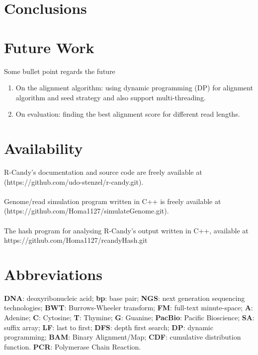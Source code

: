 \documentclass[11pt,a4paper]{report}
\begin{document}
\section{Conclusions}

\section{Future Work}
Some bullet point regards the future
\begin{enumerate}

\item On the alignment algorithm:
using dynamic programming (DP) for alignment algorithm 
and  seed strategy and also support multi-threading.

\item On evaluation: finding the best alignment score for different read lengths.
\end{enumerate}



\section{Availability}

R-Candy's documentation and source code are freely available at\\
 (https://github.com/udo-stenzel/r-candy.git).
\\\\
Genome/read simulation program written in C++ is freely available at
(https://github.com/Homa1127/simulateGenome.git).
\\\\
The hash program for analysing  R-Candy's output written in C++, available at
https://github.com/Homa1127/rcandyHash.git


\section{Abbreviations}

\textbf{DNA}: deoxyribonucleic acid;
\textbf{bp}: base pair;
\textbf{NGS}: next generation sequencing technologies;
\textbf{BWT}: Burrows-Wheeler transform;
\textbf{FM}: full-text minute-space;
\textbf{A}: Adenine;
\textbf{C}: Cytosine;
\textbf{T}: Thymine;
\textbf{G}: Guanine;
\textbf{PacBio}: Pacific Bioscience;
\textbf{SA}: suffix array;
\textbf{LF}: last to first;
\textbf{DFS}: depth first search;
\textbf{DP}: dynamic programming;
\textbf{BAM}: Binary Alignment/Map;
\textbf{CDF}: cumulative distribution function.
\textbf{PCR}: Polymerase Chain Reaction.




\end{document}
